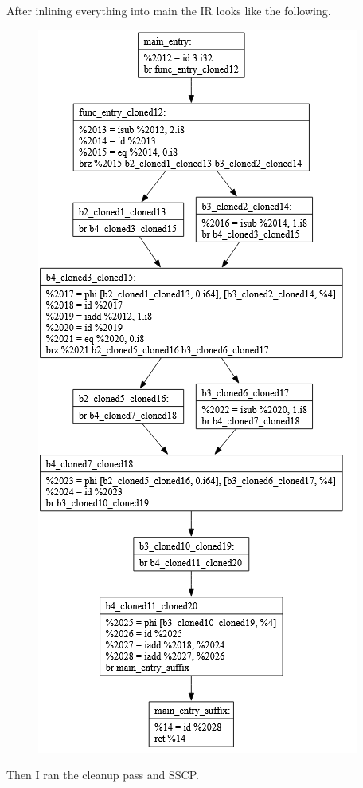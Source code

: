 \documentclass[11pt, a4paper, titlepage]{article}
\begin{document}
After inlining everything into main the IR looks like the following.

\begin{figure}[H]
  \centering
  \includegraphics[scale=0.4]{images/i35.png}
\end{figure}

Then I ran the cleanup pass and SSCP.
\end{document}
